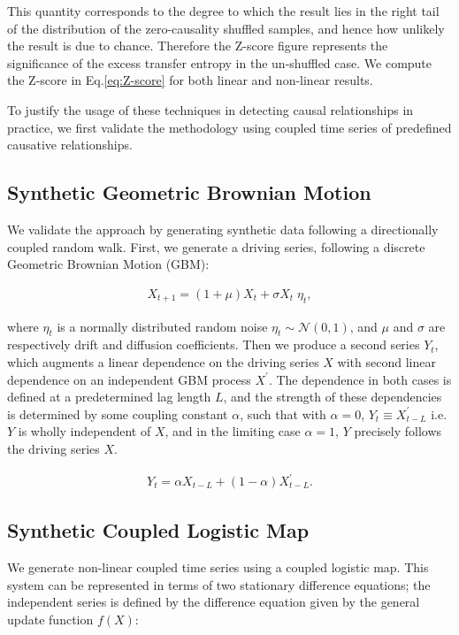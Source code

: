 \documentclass[]{rsos}%
\begin{document}
{  This quantity corresponds to the degree to which the result lies in the right tail of the distribution of the zero-causality shuffled samples, and hence how unlikely the result is due to chance. Therefore the Z-score figure represents the significance of the excess transfer entropy in the un-shuffled case. We compute the Z-score in Eq.\ref{eq:Z-score} for both linear and non-linear results.


  To justify the usage of these techniques in detecting causal relationships in practice, we first validate the methodology using coupled time series of predefined causative relationships. 


  \subsection{Synthetic Geometric Brownian Motion}\label{s.LinearSignal}
  We validate the approach by generating synthetic data following a directionally coupled random walk. First, we generate a driving series, following a discrete Geometric Brownian Motion (GBM):

  \begin{eqnarray}
      \label{eq:GBM}
      X_{t+1} = (1+\mu) X_t + \sigma X_t \; \eta_t ,
  \end{eqnarray}

  where $\eta_t$ is a normally distributed random noise  $\eta_t \sim \mathcal{N}(0,1)$, and $\mu$ and $\sigma$ are respectively drift and diffusion coefficients. Then we produce a second series $Y_t$, which augments a linear dependence on the driving series $X$ with second linear dependence on an independent GBM process $X^{\prime}$. The dependence in both cases is defined at a predetermined lag length $L$, and the strength of these dependencies is determined by some coupling constant $\alpha$, such that with $\alpha=0$, $Y_{t} \equiv X^{\prime}_{t-L}$ i.e. $Y$ is wholly independent of $X$, and in the limiting case $\alpha=1$, $Y$ precisely follows the driving series $X$.

  \begin{eqnarray}
    \label{eq:coupled_random_walk}
    Y_{t} =  \alpha X_{t-L} + (1-\alpha) X^{\prime}_{t-L} .
  \end{eqnarray}

  

  \subsection{Synthetic Coupled Logistic Map}\label{s.NonLinearSignal}
  We generate non-linear coupled time series using a coupled logistic map. This system can be represented in terms of two stationary difference equations; the independent series is defined by the difference equation given by the general update function $f(X)$:

}
\end{document}
